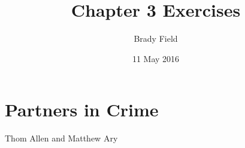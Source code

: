\documentclass[11pt]{article}
\title{Chapter 3 Exercises}
\author{Brady Field}
\date{11 May 2016}
\begin{document}
\maketitle


\section*{Partners in Crime}
\label{sec-1}

Thom Allen and Matthew Ary
\end{document}
